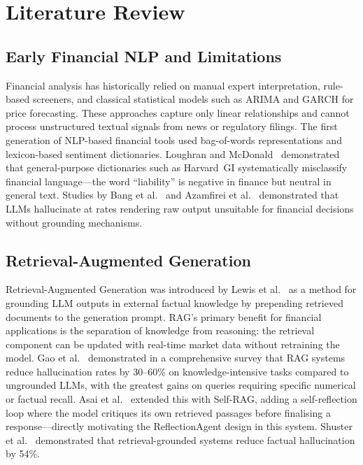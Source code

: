 \documentclass[10pt,twocolumn]{article}
\begin{document}
\section{Literature Review}
\label{sec:lit}

\subsection{Early Financial NLP and Limitations}

Financial analysis has historically relied on manual expert
interpretation, rule-based screeners, and classical statistical models
such as ARIMA and GARCH for price forecasting.
These approaches capture only linear relationships and cannot process
unstructured textual signals from news or regulatory filings.
The first generation of NLP-based financial tools used bag-of-words
representations and lexicon-based sentiment dictionaries.
Loughran and McDonald~\cite{loughran2011} demonstrated that
general-purpose dictionaries such as Harvard~GI systematically
misclassify financial language---the word ``liability'' is negative in
finance but neutral in general text.
Studies by Bang et al.~\cite{bang2023} and Azamfirei et al.~\cite{azamfirei2023} demonstrated that LLMs hallucinate at rates
rendering raw output unsuitable for financial decisions without
grounding mechanisms.

\subsection{Retrieval-Augmented Generation}

Retrieval-Augmented Generation was introduced by Lewis et al.~\cite{lewis2020rag} as a method for grounding LLM outputs in external
factual knowledge by prepending retrieved documents to the generation
prompt.
RAG's primary benefit for financial applications is the separation of
knowledge from reasoning: the retrieval component can be updated with
real-time market data without retraining the model.
Gao et al.~\cite{gao2023rag} demonstrated in a comprehensive survey
that RAG systems reduce hallucination rates by 30--60\% on
knowledge-intensive tasks compared to ungrounded LLMs, with the
greatest gains on queries requiring specific numerical or factual
recall.
Asai et al.~\cite{asai2023selfrag} extended this with Self-RAG,
adding a self-reflection loop where the model critiques its own
retrieved passages before finalising a response---directly motivating
the ReflectionAgent design in this system.
Shuster et al.~\cite{shuster2021} demonstrated that
retrieval-grounded systems reduce factual hallucination by 54\%.
\end{document}
